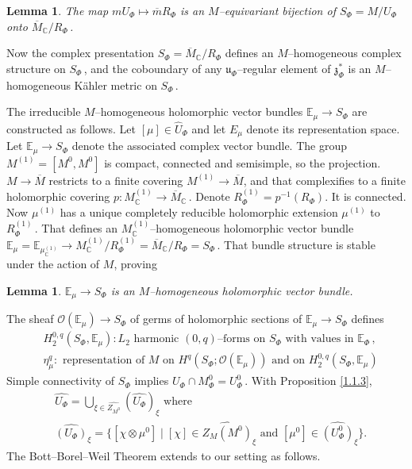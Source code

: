 \documentclass{conm-p-l}
\newtheorem{lemma}[equation]{Lemma}
\newcommand{\cO}{\mathcal{O}}
\def\gu{\mathfrak{u}}
\def\gz{\mathfrak{z}}
\def\C{\mathbb{C}}
\def\E{\mathbb{E}}
\def\cO{\mathcal{O}}
\begin{document}
\begin{lemma}\label{1.1.8}
The map $mU_\Phi \mapsto \overline{m}R_\Phi$ is an $M$--equivariant 
bijection of $S_\Phi = M/U_\Phi$ onto $\overline{M}_\C/R_\Phi$\,.
\end{lemma}
Now the complex presentation $S_\Phi = \overline{M}_\C/R_\Phi$ defines
an $M$--homogeneous complex structure on $S_\Phi$\,, and the coboundary
of any $\gu_\Phi$--regular element of $\gz_\Phi^*$ is an $M$--homogeneous
K\"ahler metric on $S_\Phi$\,.

The irreducible $M$--homogeneous holomorphic vector bundles $\E_\mu \to S_\Phi$
are constructed as follows.  Let $[\mu] \in \widehat{U}_\Phi$ and let $E_\mu$
denote its representation space.  Let $\E_\mu \to S_\Phi$ denote the
associated complex vector bundle.  The group $M^{(1)}
= [M^0,M^0]$ is compact, connected and semisimple, so the projection.
$M \to \overline{M}$ restricts to a finite covering $M^{(1)} \to \overline{M}$,
and that complexifies to a finite holomorphic covering 
$p: M^{(1)}_\C \to \overline{M}_\C$\,.  Denote $R_\Phi^{(1)} = p^{-1}(R_\Phi)$.
It is connected.  Now $\mu^{(1)}$ has a unique completely reducible
holomorphic extension $\mu^{(1)}$ to $R_\Phi^{(1)}$\,.  That defines 
an $M_\C^{(1)}$--homogeneous holomorphic vector bundle
$\E_\mu = \E_{\mu_\C^{(1)}} \to M_\C^{(1)}/R_\Phi^{(1)} = \overline{M}_\C/R_\Phi
= S_\Phi$\,.  That bundle structure is stable under the action of $M$, proving
\begin{lemma} \label{1.1.9}
$\E_\mu \to S_\Phi$ is an $M$--homogeneous holomorphic vector bundle.
\end{lemma}
The sheaf $\cO(\E_\mu) \to S_\Phi$ of germs of holomorphic 
sections of $\E_\mu \to S_\Phi$ defines
\begin{equation}\label{1.1.10}
\begin{aligned}
& H_2^{0,q}(S_\Phi,\E_\mu): L_2 \text{ harmonic $(0,q)$--forms on $S_\Phi$ 
	with values in $\E_\Phi$}\,,\\ 
& \eta_\mu^q: \text{ representation of $M$ on }
	H^q(S_\Phi;\cO(\E_\mu)) \text{ and on } H_2^{0,q}(S_\Phi,\E_\mu)
\end{aligned}
\end{equation}
Simple connectivity of $S_\Phi$ implies $U_\Phi \cap M_\Phi^0 = U_\Phi^0$\,.
With Proposition \ref{1.1.3},
\begin{equation}\label{1.1.11}
\begin{aligned}
&\widehat{U_\Phi} = {\bigcup}_{\xi \in \widehat{Z_{M^0}}}
	(\widehat{U_\Phi})_\xi \text{ where } \\
&\widehat{(U_\Phi)}_\xi = \{[\chi\otimes\mu^0] \mid 
	[\chi] \in \widehat{Z_M(M^0)}_\xi \text{ and } 
	[\mu^0] \in  \widehat{(U_\Phi^0)}_\xi\}.
\end{aligned}
\end{equation}
The Bott--Borel--Weil Theorem \cite{B1957} extends to our setting as follows.
\end{document}
